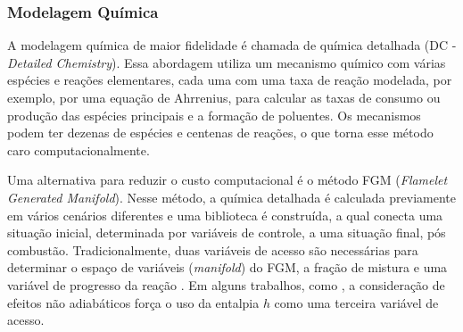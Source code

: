 

\subsubsection{Modelagem Química} \label{sec:chem}

A modelagem química de maior fidelidade é chamada de química detalhada (DC - \emph{Detailed Chemistry}).
Essa abordagem utiliza um mecanismo químico com várias espécies e reações elementares, cada uma com uma taxa de reação modelada, por exemplo, por uma equação de Ahrrenius, para calcular as taxas de consumo ou produção das espécies principais e a formação de poluentes.
Os mecanismos podem ter dezenas de espécies e centenas de reações, o que torna esse método caro computacionalmente.

Uma alternativa para reduzir o custo computacional é o método FGM (\emph{Flamelet Generated Manifold}). 
Nesse método, a química detalhada é calculada previamente em vários cenários diferentes e uma biblioteca é construída, a qual conecta uma situação inicial, determinada por variáveis de controle, a uma situação final, pós combustão.
Tradicionalmente, duas variáveis de acesso são necessárias para determinar o espaço de variáveis (\emph{manifold}) do FGM, a fração de mistura %
e uma variável de progresso da reação \cite{PetersN2000}.
Em alguns trabalhos, como \cite{SacomanoF2018CTM}, a consideração de efeitos não adiabáticos força o uso da entalpia $h$ como uma terceira variável de acesso.

